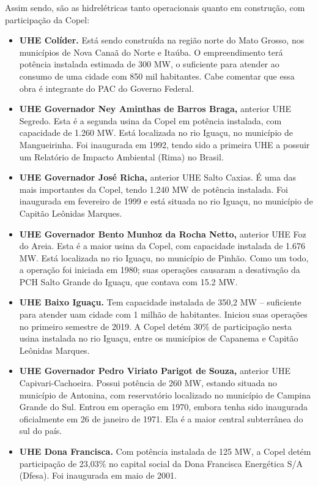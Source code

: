 \documentclass[grad,numbers]{coppe}
\providecommand{\tightlist}{%
  \setlength{\itemsep}{0pt}\setlength{\parskip}{0pt}}
\begin{document}
  Assim sendo, são as hidrelétricas tanto operacionais quanto em construção, com participação da Copel:
  \begin{itemize}
  \tightlist
  \item
    \textbf{UHE Colíder.} Está sendo construída na região norte do Mato Grosso, nos municípios de Nova Canaã do Norte e Itaúba. O empreendimento terá potência instalada estimada de 300 MW, o suficiente para atender ao consumo de uma cidade com 850 mil habitantes. Cabe comentar que essa obra é integrante do PAC do Governo Federal.
  \item
    \textbf{UHE Governador Ney Aminthas de Barros Braga,} anterior UHE Segredo. Esta é a segunda usina da Copel em potência instalada, com capacidade de 1.260 MW. Está localizada no rio Iguaçu, no município de Mangueirinha. Foi inaugurada em 1992, tendo sido a primeira UHE a possuir um Relatório de Impacto Ambiental (Rima) no Brasil.
  \item
    \textbf{UHE Governador José Richa,} anterior UHE Salto Caxias. É uma das mais importantes da Copel, tendo 1.240 MW de potência instalada. Foi inaugurada em fevereiro de 1999 e está situada no rio Iguaçu, no município de Capitão Leônidas Marques.
  \item
    \textbf{UHE Governador Bento Munhoz da Rocha Netto,} anterior UHE Foz do Areia. Esta é a maior usina da Copel, com capacidade instalada de 1.676 MW. Está localizada no rio Iguaçu, no município de Pinhão. Como um todo, a operação foi iniciada em 1980; suas operações causaram a desativação da PCH Salto Grande do Iguaçu, que contava com 15.2 MW.
  \item
    \textbf{UHE Baixo Iguaçu.} Tem capacidade instalada de 350,2 MW -- suficiente para atender uam cidade com 1 milhão de habitantes. Iniciou suas operações no primeiro semestre de 2019. A Copel detém 30\% de participação nesta usina instalada no rio Iguaçu, entre os municípios de Capanema e Capitão Leônidas Marques.
  \item
    \textbf{UHE Governador Pedro Viriato Parigot de Souza,} anterior UHE Capivari-Cachoeira. Possui potência de 260 MW, estando situada no município de Antonina, com reservatório localizado no município de Campina Grande do Sul. Entrou em operação em 1970, embora tenha sido inaugurada oficialmente em 26 de janeiro de 1971. Ela é a maior central subterrânea do sul do país.
  \item
    \textbf{UHE Dona Francisca.} Com potência instalada de 125 MW, a Copel detém participação de 23,03\% no capital social da Dona Francisca Energética S/A (Dfesa). Foi inaugurada em maio de 2001.

\end{itemize}
\end{document}
